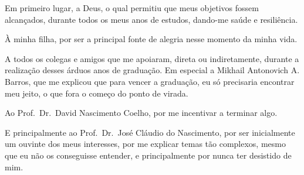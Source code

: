 Em primeiro lugar, a Deus, o qual permitiu que meus objetivos fossem alcançados, durante todos os meus anos de estudos, dando-me saúde e resiliência.\vspace{1em}

À minha ﬁlha, por ser a principal fonte de alegria nesse momento da minha vida.

A todos os colegas e amigos que me apoiaram, direta ou indiretamente, durante a realização desses árduos anos de graduação. Em especial a Mikhail Antonovich A. Barros, que me explicou que para vencer a graduação, eu só precisaria encontrar meu jeito, o que fora o começo do ponto de virada. \vspace{1em}

Ao Prof.\ Dr.\ David Nascimento Coelho, por me incentivar a terminar algo. \vspace{1em}

E principalmente ao Prof.\ Dr.\ José Cláudio do Nascimento, por ser inicialmente um ouvinte dos meus interesses, por me explicar temas tão complexos, mesmo que eu não os conseguisse entender, e principalmente por nunca ter desistido de mim.

